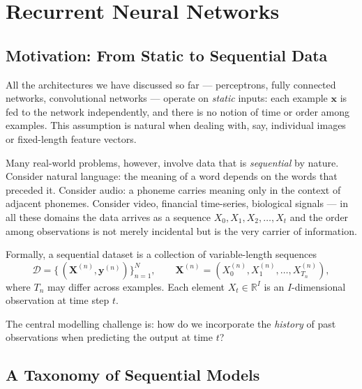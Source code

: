 \documentclass[11pt,a4paper]{article}
\begin{document}
\newpage
\section{Recurrent Neural Networks}
\label{sec:rnn}

\subsection{Motivation: From Static to Sequential Data}
\label{sec:rnn_motivation}

All the architectures we have discussed so far — perceptrons, fully connected networks, convolutional networks — operate on \emph{static} inputs: each example $\mathbf{x}$ is fed to the network independently, and there is no notion of time or order among examples. This assumption is natural when dealing with, say, individual images or fixed-length feature vectors.

Many real-world problems, however, involve data that is \emph{sequential} by nature. Consider natural language: the meaning of a word depends on the words that preceded it. Consider audio: a phoneme carries meaning only in the context of adjacent phonemes. Consider video, financial time-series, biological signals — in all these domains the data arrives as a sequence $X_0, X_1, X_2, \ldots, X_t$ and the order among observations is not merely incidental but is the very carrier of information.

Formally, a sequential dataset is a collection of variable-length sequences
\[
  \mathcal{D} = \bigl\{\, (\mathbf{X}^{(n)}, \mathbf{y}^{(n)}) \bigr\}_{n=1}^{N},
  \qquad \mathbf{X}^{(n)} = (X_0^{(n)}, X_1^{(n)}, \ldots, X_{T_n}^{(n)}),
\]
where $T_n$ may differ across examples. Each element $X_t \in \mathbb{R}^I$ is an $I$-dimensional observation at time step $t$.

The central modelling challenge is: how do we incorporate the \emph{history} of past observations when predicting the output at time $t$?

\subsection{A Taxonomy of Sequential Models}
\label{sec:seq_models_taxonomy}
\end{document}
